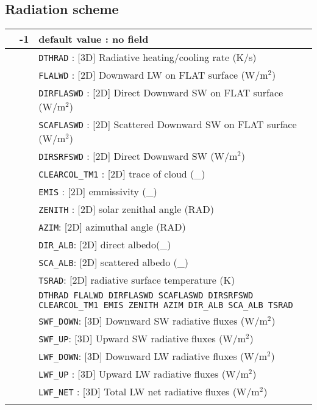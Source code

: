 \subsection{Radiation scheme}
\begin{center}
\begin{makeimage}
\begin{tabular}{|>{\centering}p{3cm}|>{\centering}p{2.5cm}|p{11cm}|}
 \hline
\multirow{47}{*}{NRAD\_3D}\label{nrad3d}\index{NRAD\_3D!\innam{NAM\_DIAG}} & {\bf -1} & default value : no field\\\cline{2-3}
&\multirow{12}{*}{0} & {\tt DTHRAD} : [3D] Radiative heating/cooling rate (K/s) \\\cline{3-3}
& &{\tt FLALWD} : [2D] Downward LW on FLAT surface  (W/m$^2$) \\\cline{3-3}
& &{\tt DIRFLASWD} : [2D] Direct Downward SW on FLAT surface  (W/m$^2$) \\\cline{3-3}
& &{\tt SCAFLASWD} : [2D] Scattered Downward SW on FLAT surface (W/m$^2$) \\\cline{3-3}
& &{\tt DIRSRFSWD} : [2D] Direct Downward SW  (W/m$^2$) \\\cline{3-3}
& & {\tt CLEARCOL\_TM1} : [2D] trace of cloud (\_)\\\cline{3-3}
& & {\tt  EMIS} : [2D] emmissivity (\_)\\\cline{3-3}
& & {\tt ZENITH} : [2D] solar zenithal angle (RAD)\\\cline{3-3}
& & {\tt AZIM}: [2D]  azimuthal angle (RAD)\\\cline{3-3}
& & {\tt DIR\_ALB}: [2D] direct albedo(\_)\\\cline{3-3}
& & {\tt SCA\_ALB}: [2D]  scattered albedo (\_)\\\cline{3-3}
& & {\tt TSRAD}: [2D] radiative surface temperature (K)\\\cline{2-3}
&\multirow{12}{*}{1} & {\tt DTHRAD FLALWD DIRFLASWD SCAFLASWD DIRSRFSWD CLEARCOL\_TM1 EMIS ZENITH AZIM DIR\_ALB SCA\_ALB TSRAD}\\\cline{3-3}
& & {\tt SWF\_DOWN}: [3D] Downward SW radiative fluxes (W/m$^2$)\\\cline{3-3}
& & {\tt SWF\_UP}: [3D] Upward SW radiative fluxes (W/m$^2$)\\\cline{3-3}
& & {\tt LWF\_DOWN}: [3D] Downward LW  radiative fluxes (W/m$^2$)\\\cline{3-3}
& & {\tt LWF\_UP} : [3D] Upward LW  radiative fluxes (W/m$^2$)\\\cline{3-3}
& & {\tt LWF\_NET} : [3D] Total LW net radiative fluxes (W/m$^2$)\\\cline{3-3}

\end{tabular}
\end{makeimage}
\end{center}
